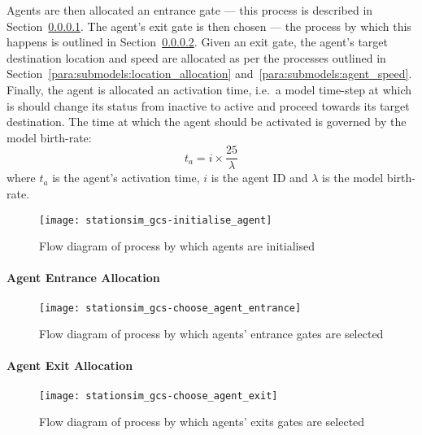 Agents are then allocated an entrance gate --- this process is described in
Section~\ref{para:submodels:agent_entrance}.
The agent's exit gate is then chosen --- the process by which this happens is
outlined in Section~\ref{para:submodels:agent_exit}.
Given an exit gate, the agent's target destination location and speed are
allocated as per the processes outlined in
Section~\ref{para:submodels:location_allocation}
and~\ref{para:submodels:agent_speed}.
Finally, the agent is allocated an activation time, i.e.\ a model time-step at
which is should change its status from inactive to active and proceed towards
its target destination.
The time at which the agent should be activated is governed by the model
birth-rate:
\begin{equation}
    t_{a} = i \times \frac{25}{\lambda}
\end{equation}
where $t_{a}$ is the agent's activation time, $i$ is the agent ID and $\lambda$
is the model birth-rate.

\begin{figure}[h]
    \centering
    \texttt{[image: stationsim\_gcs-initialise\_agent]}
    \caption{Flow diagram of process by which agents are
    initialised}\label{fig:flow:agent_initialisation}
\end{figure}

\paragraph{Agent Entrance Allocation}\label{para:submodels:agent_entrance}

\begin{figure}[h]
    \centering
    \texttt{[image: stationsim\_gcs-choose\_agent\_entrance]}
    \caption{Flow diagram of process by which agents' entrance gates are
    selected}\label{fig:flow:agent_entrance}
\end{figure}

\paragraph{Agent Exit Allocation}\label{para:submodels:agent_exit}

\begin{figure}[h]
    \centering
    \texttt{[image: stationsim\_gcs-choose\_agent\_exit]}
    \caption{Flow diagram of process by which agents' exits gates are
    selected}\label{fig:flow:agent_exit}
\end{figure}

